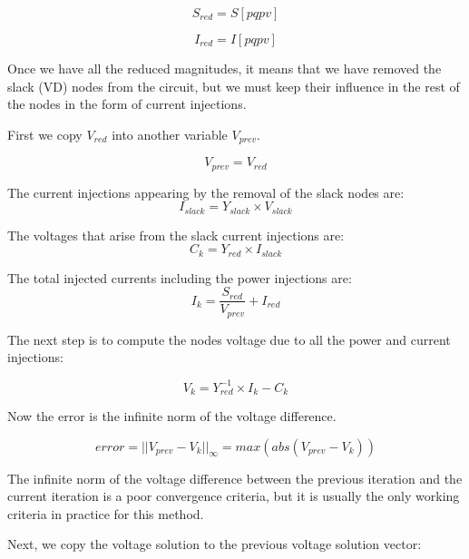 \documentclass[a4paper,twoside,fleqn]{tufte-book}
\begin{document}
\begin{equation}
S_{red} = S[pqpv]
\end{equation}

\begin{equation}
I_{red} = I[pqpv]
\end{equation}


Once we have all the reduced magnitudes, it means that we have removed the slack (VD) nodes from the circuit, but we must keep their influence in the rest of the nodes in the form of current injections.

First we copy $V_{red}$ into another variable $V_{prev}$.

\begin{equation}
V_{prev} = V_{red}
\end{equation}

The current injections appearing by the removal of the slack nodes are:
\begin{equation}
I_{slack} = Y_{slack} \times V_{slack}
\end{equation}

The voltages that arise from the slack current injections are:
\begin{equation}
C_k = Y_{red} \times I_{slack}
\end{equation}

The total injected currents including the power injections are:
\begin{equation}
I_k = \frac{S_{red}}{V_{prev}} + I_{red}
\label{eq:zm_ik}
\end{equation}

The next step is to compute the nodes voltage due to all the power and current injections:

\begin{equation}
V_k = Y_{red}^{-1} \times I_k - C_k
\end{equation}

Now the error is the infinite norm of the voltage difference.

\begin{equation}
error = ||V_{prev} - V_k ||_{\infty} = max(abs(V_{prev} - V_k ))
\end{equation}

The infinite norm of the voltage difference between the previous iteration and the current iteration is a poor convergence criteria, but it is usually the only working criteria in practice for this method.

Next, we copy the voltage solution to the previous voltage solution vector:
\end{document}

